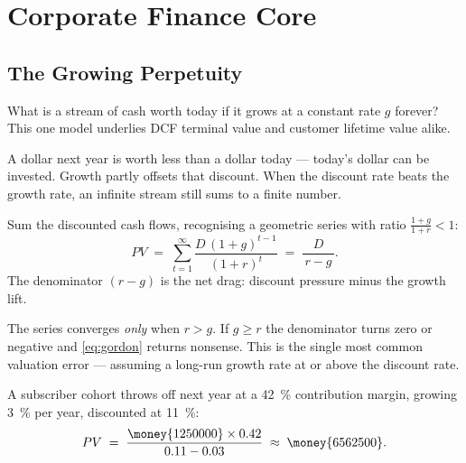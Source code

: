\chapter{Corporate Finance Core}\label{ch:corporate-finance-core}


\section{The Growing Perpetuity}\label{sec:growing-perpetuity}

\begin{decision}
What is a stream of cash worth today if it grows at a constant rate \(g\) forever?
This one model underlies DCF terminal value and customer lifetime value alike.
\end{decision}

\begin{intuition}
A dollar next year is worth less than a dollar today --- today's dollar can be invested.
Growth partly offsets that discount. When the discount rate beats the growth rate,
an infinite stream still sums to a finite number.
\end{intuition}

\begin{derivation}
Sum the discounted cash flows, recognising a geometric series with ratio
\(\frac{1+g}{1+r}<1\):
\begin{equation}\label{eq:gordon}
  PV \;=\; \sum_{t=1}^{\infty}\frac{D\,(1+g)^{t-1}}{(1+r)^{t}}
      \;=\; \frac{D}{\,r-g\,}.
\end{equation}
The denominator \((r-g)\) is the net drag: discount pressure minus the growth lift.
\end{derivation}

\begin{breaks}
The series converges \emph{only} when \(r>g\). If \(g\ge r\) the denominator turns
zero or negative and \cref{eq:gordon} returns nonsense. This is the single most
common valuation error --- assuming a long-run growth rate at or above the discount rate.
\end{breaks}

\begin{worked}
A subscriber cohort throws off  next year at a \qty{42}{\percent}
contribution margin, growing \qty{3}{\percent} per year, discounted at \qty{11}{\percent}:
\[
  PV \;=\; \frac{\money{1250000}\times 0.42}{0.11-0.03}\;\approx\;\money{6562500}.
\]
\end{worked}


